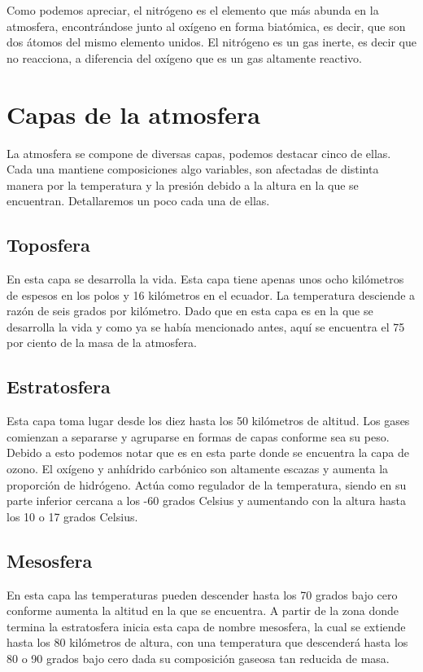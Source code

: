 \documentclass[a4paper,12pt]{report}
\begin{document}
Como podemos apreciar, el nitrógeno es el elemento que más abunda en la atmosfera, encontrándose junto al oxígeno en forma biatómica, es decir, que son dos átomos del mismo elemento unidos. El nitrógeno es un gas inerte, es decir que no reacciona, a diferencia del oxígeno que es un gas altamente reactivo.


\section{Capas de la atmosfera}

La atmosfera se compone de diversas capas, podemos destacar cinco de ellas. Cada una mantiene composiciones algo variables, son afectadas de distinta manera por la temperatura y la presión debido a la altura en la que se encuentran. Detallaremos un poco cada una de ellas.


\subsection{Toposfera}

En esta capa se desarrolla la vida. Esta capa tiene apenas unos ocho kilómetros de espesos en los polos y 16 kilómetros en el ecuador. La temperatura desciende a razón de seis grados por kilómetro. Dado que en esta capa es en la que se desarrolla la vida y como ya se había mencionado antes, aquí se encuentra el 75 por ciento de la masa de la atmosfera.

\subsection{Estratosfera}

Esta capa toma lugar desde los diez hasta los 50 kilómetros de altitud. Los gases comienzan a separarse y agruparse en formas de capas conforme sea su peso. Debido a esto podemos notar que es en esta parte donde se encuentra la capa de ozono. El oxígeno y anhídrido carbónico son altamente escazas y aumenta la proporción de hidrógeno. Actúa como regulador de la temperatura, siendo en su parte inferior cercana a los -60 grados Celsius y aumentando con la altura hasta los 10 o 17 grados Celsius.

\subsection{Mesosfera}

En esta capa las temperaturas pueden descender hasta los 70 grados bajo cero conforme aumenta la altitud en la que se encuentra. A partir de la zona donde termina la estratosfera inicia esta capa de nombre mesosfera, la cual se extiende hasta los 80 kilómetros de altura, con una temperatura que descenderá hasta los 80 o 90 grados bajo cero dada su composición gaseosa tan reducida de masa.
\end{document}
